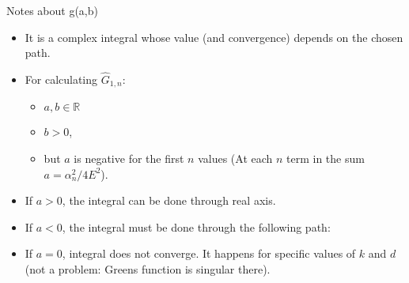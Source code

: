 \begin{frame}[allowframebreaks]{Notes about g(a,b)}
  \begin{itemize}
    \item It is a complex integral whose value (and convergence) depends on the chosen path.
    \item For calculating $\hat{G}_{1,n}$:
      \begin{itemize}
        \item $a,b \in \mathbb{R}$
        \item $b>0$, 
        \item but $a$ is negative for the first $n$ values (At each $n$ term in 
          the sum $a=\alpha_n^2/4E^2$).
      \end{itemize}
    \item If $a>0$, the integral can be done through real axis.
    \item If $a<0$, the integral must be done through the following path:

      \vbs

      \usetikzlibrary {arrows.meta}

    \item If $a=0$, integral does not converge. It happens for specific values 
      of $k$ and $d$ (not a problem: Greens function is singular there).
  \end{itemize}
\end{frame}


